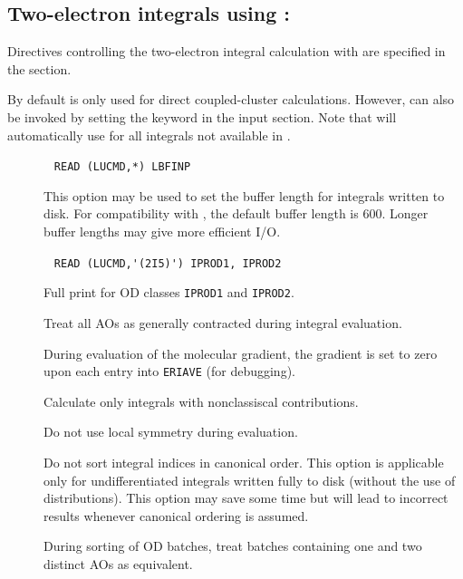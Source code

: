 \subsection{Two-electron integrals using {\eri}: }

Directives controlling the two-electron integral calculation with {\eri}
are specified in the  section.

By default {\eri} is only used for direct coupled-cluster
calculations. However, {\eri} can also be invoked by setting the
 keyword in the  input section. Note that
{\dalton} will automatically use {\her} for all integrals not
available in {\eri}.

\begin{description}
\item[]\verb| |\newline
\verb|READ (LUCMD,*) LBFINP|

This option may be used to set the buffer length for integrals written
to disk. For compatibility with {\twoint}, the default buffer length
is 600. Longer buffer lengths may give more efficient I/O.

\item[]\verb| |\newline
\verb|READ (LUCMD,'(2I5)') IPROD1, IPROD2|

Full print for OD classes \verb|IPROD1| and \verb|IPROD2|.

\item[] Treat all AOs as generally contracted during
integral evaluation.

\item[] During evaluation of the molecular gradient, the
gradient is set to zero upon each entry into \verb|ERIAVE| (for
debugging).

\item[] Calculate only integrals with nonclassiscal
contributions.

\item[] Do not use local symmetry during evaluation.

\item[] Do not sort integral indices in canonical
order. This option is applicable only for undifferentiated integrals
written fully to disk (without the use of distributions). This option
may save some time but will lead to incorrect results whenever
canonical ordering is assumed.

\item[] During sorting of OD batches, treat batches
containing one and two distinct AOs as equivalent.


\end{description}
